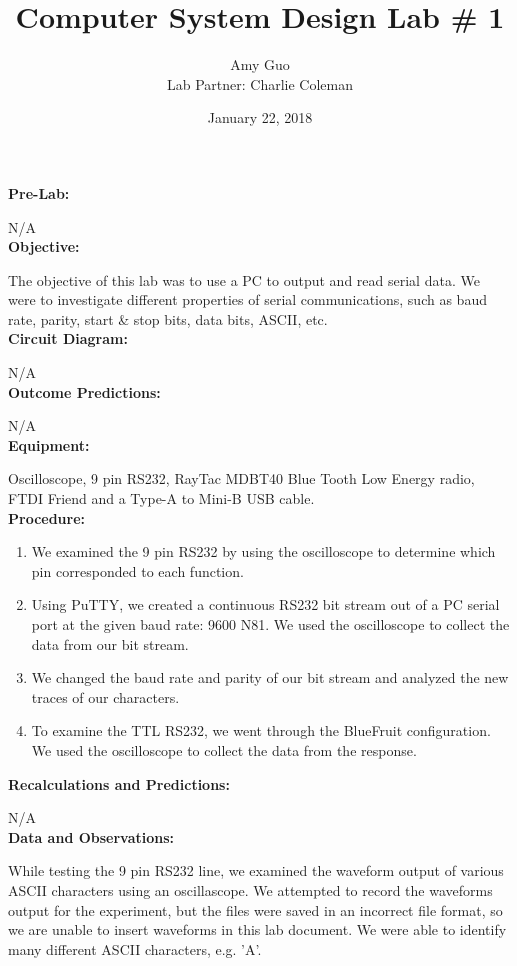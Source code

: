 \documentclass{article}
\title{Computer System Design Lab \# 1}
\author{Amy Guo \\ Lab Partner: Charlie Coleman}
\date{January 22, 2018}
\begin{document}
\maketitle
\pagebreak

\noindent\textbf{Pre-Lab:}

N/A\\

\noindent\textbf{Objective:}

The objective of this lab was to use a PC to output and read serial data. We were to investigate different properties of serial communications, such as baud rate, parity, start \& stop bits, data bits, ASCII, etc.\\

\noindent\textbf{Circuit Diagram:}

N/A\\

\noindent\textbf{Outcome Predictions:}

N/A\\

\noindent\textbf{Equipment:}

Oscilloscope, 9 pin RS232, RayTac MDBT40 Blue Tooth Low Energy radio, FTDI Friend and a Type-A to Mini-B USB cable.\\

\noindent\textbf{Procedure:}

\begin{enumerate}
\item We examined the 9 pin RS232 by using the oscilloscope to determine which pin corresponded to each function.
\item Using PuTTY, we created a continuous RS232 bit stream out of a PC serial port at the given baud rate: 9600 N81. We used the oscilloscope to collect the data from our bit stream.
\item We changed the baud rate and parity of our bit stream and analyzed the new traces of our characters.
\item To examine the TTL RS232, we went through the BlueFruit configuration. We used the oscilloscope to collect the data from the response.
\end{enumerate}

\noindent\textbf{Recalculations and Predictions:}

N/A\\

\noindent\textbf{Data and Observations:}

While testing the 9 pin RS232 line, we examined the waveform output of various ASCII characters using an oscillascope. We attempted to record the waveforms output for the experiment, but the files were saved in an incorrect file format, so we are unable to insert waveforms in this lab document. We were able to identify many different ASCII characters, e.g. 'A'.
\end{document}
